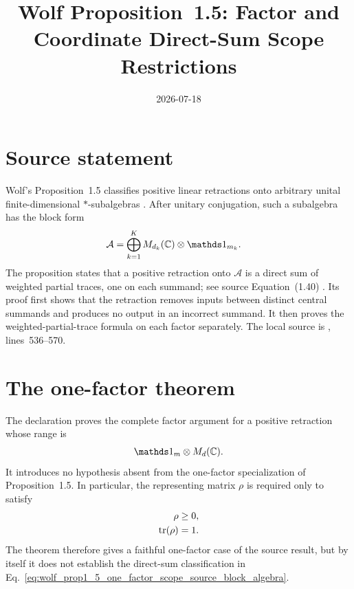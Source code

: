 \documentclass{article}
\title{Wolf Proposition~1.5: Factor and Coordinate Direct-Sum Scope Restrictions}
\author{}
\date{2026-07-18}
\begin{document}
\maketitle
{}

\section{Source statement}

Wolf's Proposition~1.5 classifies positive linear retractions onto arbitrary
unital finite-dimensional $*$-subalgebras
\cite[Proposition~1.5]{Wolf2012Quantum}. After unitary conjugation, such a
subalgebra has the block form
\begin{align}
    \mathcal A
        &=\bigoplus_{k=1}^{K}
          M_{d_k}(\mathbb C)\otimes\one_{m_k}.
    \label{eq:wolf_prop1_5_one_factor_scope_source_block_algebra}
\end{align}
The proposition states that a positive retraction onto $\mathcal A$ is a
direct sum of weighted partial traces, one on each summand; see source
Equation~(1.40) \cite[Equation~(1.40)]{Wolf2012Quantum}. Its proof first shows
that the retraction removes inputs between distinct central summands and
produces no output in an incorrect summand. It then proves the
weighted-partial-trace formula on each factor separately. The local source is
,
lines~536--570.

\section{The one-factor theorem}

The declaration
proves the complete factor argument for a positive retraction whose range is
\begin{align}
    \one_m\otimes M_d(\mathbb C).
    \label{eq:wolf_prop1_5_one_factor_scope_formal_factor_range}
\end{align}
It introduces no hypothesis absent from the one-factor specialization of
Proposition~1.5. In particular, the representing matrix $\rho$ is required
only to satisfy
\begin{align}
    \rho&\geq0,
    \label{eq:wolf_prop1_5_one_factor_scope_density_positive}\\
    \operatorname{tr}(\rho)&=1.
    \label{eq:wolf_prop1_5_one_factor_scope_density_trace_one}
\end{align}
The theorem therefore gives a faithful one-factor case of the source result,
but by itself it does not establish the direct-sum classification in
Eq.~\ref{eq:wolf_prop1_5_one_factor_scope_source_block_algebra}.
\end{document}
